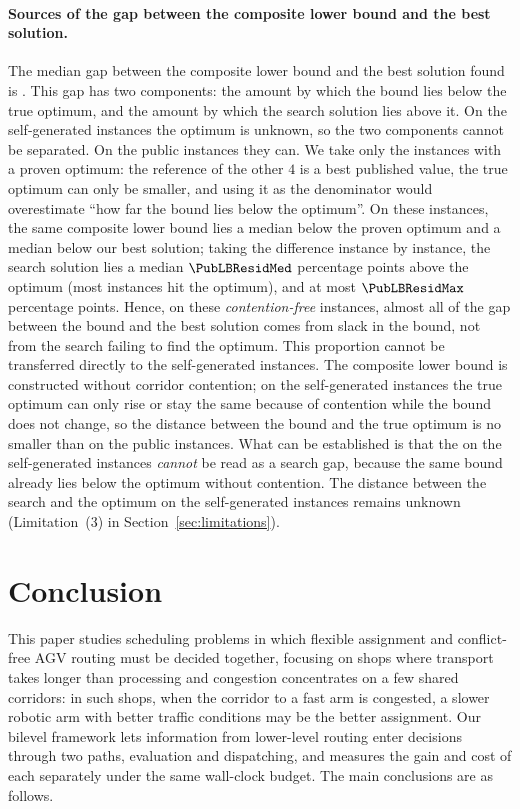\paragraph{Sources of the gap between the composite lower bound and the best solution.}
The median gap between the composite lower bound and the best solution found is \LBGapMed{}. This gap has two components: the amount by which the bound lies below the true optimum, and the amount by which the search solution lies above it. On the self-generated instances the optimum is unknown, so the two components cannot be separated.
On the public instances they can. We take only the \PubNOpt{} instances with a proven optimum: the reference of the other $4$ is a best published value, the true optimum can only be smaller, and using it as the denominator would overestimate ``how far the bound lies below the optimum''.
On these \PubNOpt{} instances, the same composite lower bound lies a median \PubLBSlack{} below the proven optimum and a median \PubLBTotal{} below our best solution; taking the difference instance by instance, the search solution lies a median $\PubLBResidMed$ percentage points above the optimum (most instances hit the optimum), and at most $\PubLBResidMax$ percentage points.
Hence, on these \emph{contention-free} instances, almost all of the gap between the bound and the best solution comes from slack in the bound, not from the search failing to find the optimum.
This proportion cannot be transferred directly to the self-generated instances. The composite lower bound is constructed without corridor contention; on the self-generated instances the true optimum can only rise or stay the same because of contention while the bound does not change, so the distance between the bound and the true optimum is no smaller than on the public instances.
What can be established is that the \LBGapMed{} on the self-generated instances \emph{cannot} be read as a search gap, because the same bound already lies \PubLBSlack{} below the optimum without contention. The distance between the search and the optimum on the self-generated instances remains unknown (Limitation~(3) in Section~\ref{sec:limitations}).



\section{Conclusion}

This paper studies scheduling problems in which flexible assignment and conflict-free AGV routing must be decided together, focusing on shops where transport takes longer than processing and congestion concentrates on a few shared corridors: in such shops, when the corridor to a fast arm is congested, a slower robotic arm with better traffic conditions may be the better assignment. Our bilevel framework lets information from lower-level routing enter decisions through two paths, evaluation and dispatching, and measures the gain and cost of each separately under the same wall-clock budget. The main conclusions are as follows.


